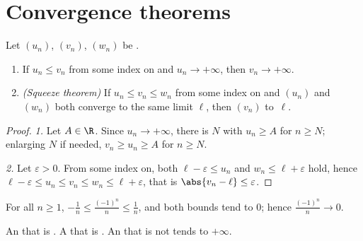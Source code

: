\section{Convergence theorems}

\begin{theorem}\label{thm:g12:seq:squeeze}
Let $(u_n)$, $(v_n)$, $(w_n)$ be .
\begin{enumerate}
  \item If $u_n \leq v_n$ from some index on and $u_n \to +\infty$, then
        $v_n \to +\infty$.
  \item \emph{(Squeeze theorem)} If
        $u_n \leq v_n \leq w_n$ from some index on and $(u_n)$ and $(w_n)$
        both converge to the same limit $\ell$, then $(v_n)$ 
        to~$\ell$.
\end{enumerate}
\end{theorem}

\begin{proof}
\emph{1.} Let $A \in \R$. Since $u_n \to +\infty$, there is $N$ with
$u_n \geq A$ for $n \geq N$; enlarging $N$ if needed, $v_n \geq u_n \geq A$
for $n \geq N$.

\emph{2.} Let $\varepsilon > 0$. From some index on, both
$\ell - \varepsilon \leq u_n$ and $w_n \leq \ell + \varepsilon$ hold, hence
$\ell - \varepsilon \leq u_n \leq v_n \leq w_n \leq \ell + \varepsilon$, that
is $\abs{v_n - \ell} \leq \varepsilon$.
\end{proof}

\begin{example}
For all $n \geq 1$, $-\frac{1}{n} \leq \frac{(-1)^n}{n} \leq \frac{1}{n}$, and
both bounds tend to $0$; hence $\frac{(-1)^n}{n} \to 0$.
\end{example}

\begin{theorem}\label{thm:g12:seq:monotone}
An   that is  . A  
that is  . An   that is not  tends to $+\infty$.
\end{theorem}

